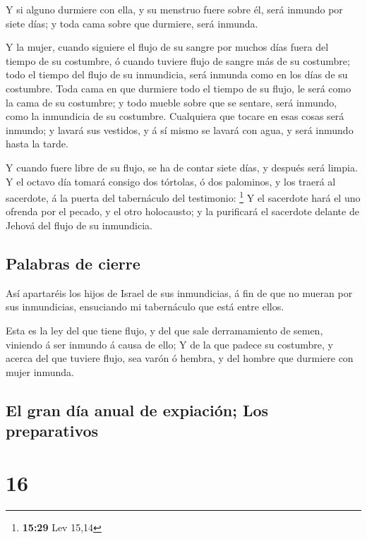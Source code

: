  Y si alguno durmiere con ella, y su menstruo fuere sobre
él, será inmundo por siete días; y toda cama sobre que durmiere, será
inmunda.

 Y la mujer, cuando siguiere el flujo de su sangre por
muchos días fuera del tiempo de su costumbre, ó cuando tuviere flujo de
sangre más de su costumbre; todo el tiempo del flujo de su inmundicia,
será inmunda como en los días de su costumbre.  Toda cama
en que durmiere todo el tiempo de su flujo, le será como la cama de su
costumbre; y todo mueble sobre que se sentare, será inmundo, como la
inmundicia de su costumbre.  Cualquiera que tocare en esas
cosas será inmundo; y lavará sus vestidos, y á sí mismo se lavará con
agua, y será inmundo hasta la tarde.

 Y cuando fuere libre de su flujo, se ha de contar siete
días, y después será limpia.  Y el octavo día tomará
consigo dos tórtolas, ó dos palominos, y los traerá al sacerdote, á la
puerta del tabernáculo del testimonio: \footnote{\textbf{15:29} Lev
  15,14}  Y el sacerdote hará el uno ofrenda por el pecado,
y el otro holocausto; y la purificará el sacerdote delante de Jehová del
flujo de su inmundicia.

\hypertarget{palabras-de-cierre}{%
\subsection{Palabras de cierre}\label{palabras-de-cierre}}

 Así apartaréis los hijos de Israel de sus inmundicias, á
fin de que no mueran por sus inmundicias, ensuciando mi tabernáculo que
está entre ellos.

 Esta es la ley del que tiene flujo, y del que sale
derramamiento de semen, viniendo á ser inmundo á causa de ello;
 Y de la que padece su costumbre, y acerca del que tuviere
flujo, sea varón ó hembra, y del hombre que durmiere con mujer inmunda.

\hypertarget{el-gran-duxeda-anual-de-expiaciuxf3n-los-preparativos}{%
\subsection{El gran día anual de expiación; Los
preparativos}\label{el-gran-duxeda-anual-de-expiaciuxf3n-los-preparativos}}

\hypertarget{section-15}{%
\section{16}\label{section-15}}

